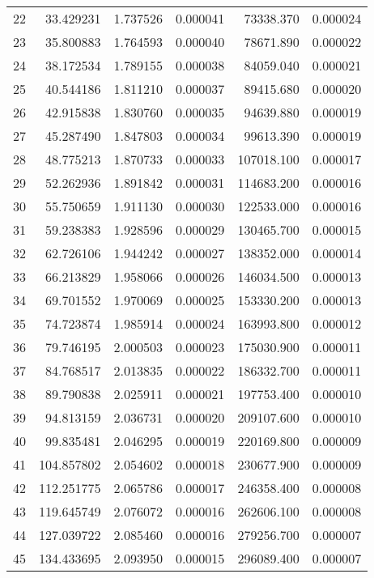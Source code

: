 \begin{tabular}{lrrrrr}
22 &    33.429231 &  1.737526 &  0.000041 &    73338.370 &  0.000024 \\
23 &    35.800883 &  1.764593 &  0.000040 &    78671.890 &  0.000022 \\
24 &    38.172534 &  1.789155 &  0.000038 &    84059.040 &  0.000021 \\
25 &    40.544186 &  1.811210 &  0.000037 &    89415.680 &  0.000020 \\
26 &    42.915838 &  1.830760 &  0.000035 &    94639.880 &  0.000019 \\
27 &    45.287490 &  1.847803 &  0.000034 &    99613.390 &  0.000019 \\
28 &    48.775213 &  1.870733 &  0.000033 &   107018.100 &  0.000017 \\
29 &    52.262936 &  1.891842 &  0.000031 &   114683.200 &  0.000016 \\
30 &    55.750659 &  1.911130 &  0.000030 &   122533.000 &  0.000016 \\
31 &    59.238383 &  1.928596 &  0.000029 &   130465.700 &  0.000015 \\
32 &    62.726106 &  1.944242 &  0.000027 &   138352.000 &  0.000014 \\
33 &    66.213829 &  1.958066 &  0.000026 &   146034.500 &  0.000013 \\
34 &    69.701552 &  1.970069 &  0.000025 &   153330.200 &  0.000013 \\
35 &    74.723874 &  1.985914 &  0.000024 &   163993.800 &  0.000012 \\
36 &    79.746195 &  2.000503 &  0.000023 &   175030.900 &  0.000011 \\
37 &    84.768517 &  2.013835 &  0.000022 &   186332.700 &  0.000011 \\
38 &    89.790838 &  2.025911 &  0.000021 &   197753.400 &  0.000010 \\
39 &    94.813159 &  2.036731 &  0.000020 &   209107.600 &  0.000010 \\
40 &    99.835481 &  2.046295 &  0.000019 &   220169.800 &  0.000009 \\
41 &   104.857802 &  2.054602 &  0.000018 &   230677.900 &  0.000009 \\
42 &   112.251775 &  2.065786 &  0.000017 &   246358.400 &  0.000008 \\
43 &   119.645749 &  2.076072 &  0.000016 &   262606.100 &  0.000008 \\
44 &   127.039722 &  2.085460 &  0.000016 &   279256.700 &  0.000007 \\
45 &   134.433695 &  2.093950 &  0.000015 &   296089.400 &  0.000007 \\

\end{tabular}
